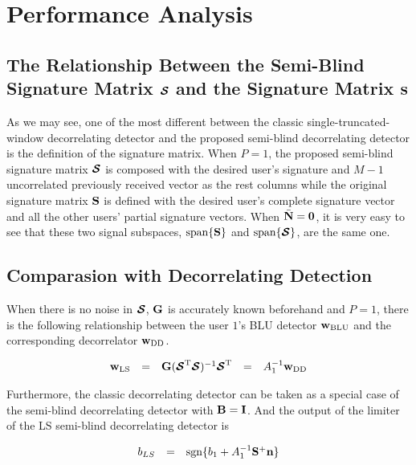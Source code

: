 \documentclass[a4paper,10pt,fleqn, twocolumn]{IEEETran}
\newcommand{\bG}{{\bf G}}
\newcommand{\bn}{{\bf n}}
\newcommand{\bw}{{\bf w}}
\newcommand{\bN}{{\bf N}}
\newcommand{\bS}{{\bf S}}
\newcommand{\bI}{{\bf I}}
\newcommand{\bB}{{\bf B}}
\newcommand{\bcS}{{\mbox {\boldmath ${\cal S}$}}}
\begin{document}
\section{Performance Analysis}

\subsection{The Relationship Between the Semi-Blind Signature Matrix $\bcS$ and the Signature Matrix $\bS$}

As we may see, one of the most different between the classic
single-truncated-window decorrelating detector and the proposed
semi-blind decorrelating detector is the definition of the
signature matrix. When $P=1$, the proposed semi-blind signature
matrix $\bcS$ is composed with the desired user's signature and
$M-1$ uncorrelated previously received vector as the rest columns
while the original signature matrix $\bS$ is defined with the
desired user's complete signature vector and all the other users'
partial signature vectors. When $\bar{\bN} = \mathbf{0}$, it is
very easy to see that these two signal subspaces,
$\mbox{span}\{\bS\}$ and $\mbox{span}\{\bcS\}$, are the same one.

\subsection{Comparasion with Decorrelating Detection }

When there is no noise in $\bcS$, $\bG$ is accurately known
beforehand and $P=1$, there is the following relationship between
the user $1$'s BLU detector $\bw_{\rm BLU}$ and the corresponding
decorrelator $\bw_{\rm DD}$.

\begin{equation}
\begin{array}{rcccl}
\bw_{\rm LS}&=&\bG(\bcS^{\rm T}\bcS)^{-1}\bcS^{\rm
T}&=&A_1^{-1}\bw_{\rm DD}
\end{array}
\end{equation} \label{wN0}

\noindent Furthermore, the classic decorrelating detector can be
taken as a special case of the semi-blind decorrelating detector
with $\bB =\bI$. And the output of the limiter of the LS
semi-blind decorrelating detector is

\begin{equation}
\begin{array}{rcl}
b_{LS}&=&\mbox{sgn}\{b_1+A_1^{-1}\bS^+\bn\}
\end{array} \label{b_LS_N0}
\end{equation}
\end{document}
